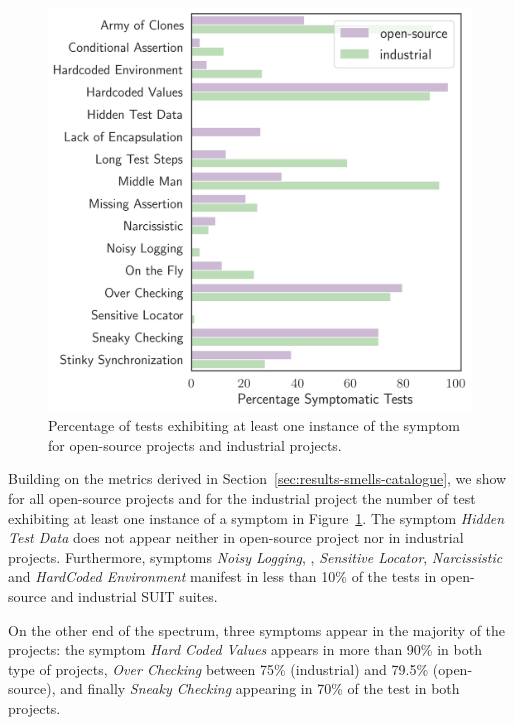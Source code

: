 \begin{figure}
\centering
\includegraphics[width=0.9\linewidth]{figures/smells/diffusion.png}
\caption{Percentage of tests exhibiting at least one instance of the symptom for open-source projects and industrial projects.}  
\label{fig:diffusion}
\end{figure}

Building on the metrics derived in Section~\ref{sec:results-smells-catalogue}, we show for all open-source projects and for the industrial project the number of test exhibiting at least one instance of a symptom in Figure~\ref{fig:diffusion}. The symptom \emph{Hidden Test Data} does not appear neither in open-source project nor in industrial projects. Furthermore, symptoms \emph{Noisy Logging}, , \emph{Sensitive Locator}, \emph{Narcissistic} and \emph{HardCoded Environment} manifest in less than 10\% of the tests in open-source and industrial SUIT suites. 

On the other end of the spectrum, three symptoms appear in the majority of the projects: the symptom \emph{Hard Coded Values} appears in more than 90\% in both type of projects, \emph{Over Checking} between 75\% (industrial) and 79.5\% (open-source), and finally \emph{Sneaky Checking} appearing in 70\% of the test in both projects.

